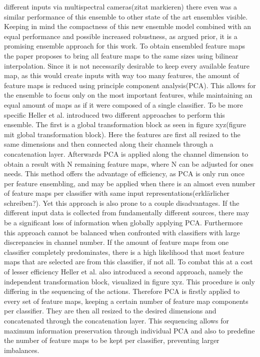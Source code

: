 different inputs via multispectral cameras(zitat markieren) there even was a similar performance of this ensemble to other state of the 
art ensembles visible. Keeping in mind the compactness of this new ensemble model combined with an equal performance and possible 
increased robustness, as argued prior, it is a promising ensemble approach for this work.
To obtain ensembled feature maps the paper proposes to bring all feature maps to the same sizes using bilinear interpolation. Since 
it is not necessarily desirable to keep every available feature map, as this would create inputs with way too many features, the amount of feature 
maps is reduced using principle component analysis(PCA). This allows for the ensemble to focus only on the most important features, while maintaining 
an equal amount of maps as if it were composed of a single classifier. To be more specific Heller et al. \cite{EnsembleHeller2023} introduced two different 
approaches to perform this ensemble. The first is a global transformation block as seen in figure xyz(figure mit global transformation block). 
Here the features are first all resized to the same dimensions and then connected along their channels through a concatenation layer.
Afterwards PCA is applied along the channel dimension to obtain a result with N remaining feature maps, where N can be adjusted for ones 
needs. This method offers the advantage of efficiency, as PCA is only run once per feature ensembling, and may be applied when there is 
an almost even number of feature maps per classifier with same input representations(erklärlicher schreiben?). Yet this approach is also 
prone to a couple disadvantages. If the different input data is collected from fundamentally different sources, there may be a significant 
loss of information when globally applying PCA. Furthermore this approach cannot be balanced when confronted with classifiers with large 
discrepancies in channel number. If the amount of feature maps from one classifier completely predominates, there is a high likelihood 
that most feature maps that are selected are from this classifier, if not all.
To combat this at a cost of lesser efficiency Heller et al. also introduced a second approach, namely the independent transformation block, 
visualized in figure xyz. 
This procedure is only differing in the sequencing of the actions. Therefore PCA is firstly applied to every set of feature maps, keeping 
a certain number of feature map components per classifier. They are then all resized to the desired dimensions and concatenated through 
the concatenation layer. This sequencing allows for maximum information preservation through individual PCA and also to predefine the number 
of feature maps to be kept per classifier, preventing larger imbalances.



